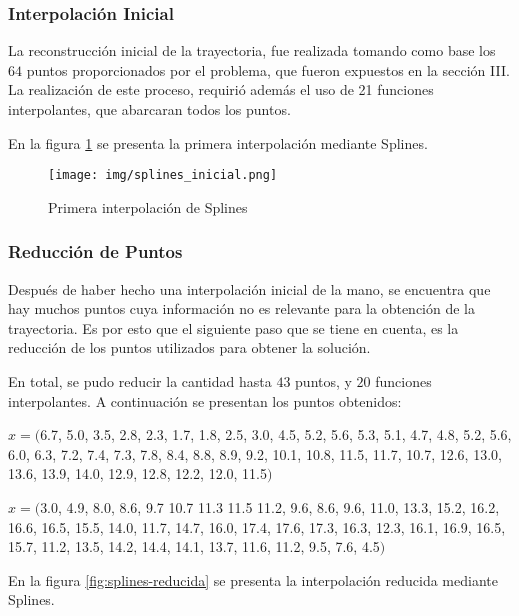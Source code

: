 \documentclass[conference]{IEEEtran}
\begin{document}
\subsubsection{Interpolación Inicial}

La reconstrucción inicial de la trayectoria, fue realizada tomando como base los $64$ puntos proporcionados por el problema, que fueron expuestos en la sección III. La realización de este proceso, requirió además el uso de 21 funciones interpolantes, que abarcaran todos los puntos.

En la figura \ref{fig:splines-inicial} se presenta la primera interpolación mediante Splines. \par

\begin{figure}[ht!]
\centering
\texttt{[image: img/splines\_inicial.png]}
\vspace{-1em}
\caption{Primera interpolación de Splines}
\label{fig:splines-inicial}
\end{figure}

\subsubsection{Reducción de Puntos}

Después de haber hecho una interpolación inicial de la mano, se encuentra que hay muchos puntos cuya información no es relevante para la obtención de la trayectoria. Es por esto que el siguiente paso que se tiene en cuenta, es la reducción de los puntos utilizados para obtener la solución. \par

En total, se pudo reducir la cantidad hasta $43$ puntos, y $20$ funciones interpolantes. A continuación se presentan los puntos obtenidos:

$x=($6.7, 5.0, 3.5, 2.8, 2.3, 1.7, 1.8, 2.5, 3.0, 4.5, 5.2, 5.6, 5.3, 5.1, 4.7, 4.8, 5.2, 5.6, 6.0, 6.3, 7.2, 7.4, 7.3, 7.8, 8.4, 8.8, 8.9, 9.2, 10.1, 10.8, 11.5, 11.7, 10.7, 12.6, 13.0, 13.6, 13.9, 14.0, 12.9, 12.8, 12.2, 12.0, 11.5$)$ \par

$x=($3.0, 4.9, 8.0, 8.6, 9.7 10.7 11.3 11.5 11.2, 9.6, 8.6, 9.6, 11.0, 13.3, 15.2, 16.2, 16.6, 16.5, 15.5, 14.0, 11.7, 14.7, 16.0, 17.4, 17.6, 17.3, 16.3, 12.3, 16.1, 16.9, 16.5, 15.7, 11.2, 13.5, 14.2, 14.4, 14.1, 13.7, 11.6, 11.2, 9.5, 7.6, 4.5$)$ \par

En la figura \ref{fig:splines-reducida} se presenta la interpolación reducida mediante Splines. \par
\end{document}
